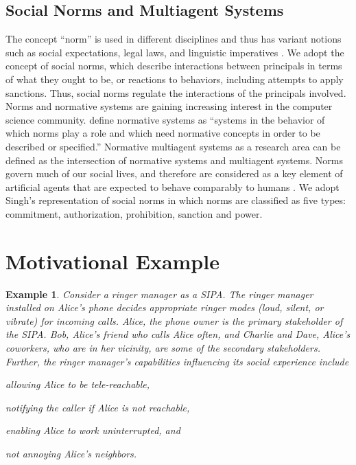 \documentclass[11pt,          %
               phd,           %
               onehalfspacing %
               ]{ncsuthesis}
\newtheorem{example}{Example}
\begin{document}
\subsection{Social Norms and Multiagent Systems}

The concept ``norm'' is used in different disciplines and thus has
variant notions such as social expectations, legal laws, and linguistic
imperatives \citep{Boella2009NormativeSystems}. We adopt the concept of
social norms, which describe interactions between principals in terms of
what they ought to be, or reactions to behaviors, including attempts to
apply sanctions. Thus, social norms regulate the interactions of the
principals involved. Norms and normative systems are gaining increasing
interest in the computer science community. \citet{Meyer+Wieringa-93}
define normative systems as ``systems in the behavior of which norms
play a role and which need normative concepts in order to be described
or specified.'' Normative multiagent systems as a research area can be
defined as the intersection of normative systems and multiagent systems.
Norms govern much of our social lives, and therefore are considered as a
key element of artificial agents that are expected to behave comparably
to humans \citep{Boella2006NormativeSystems}. We adopt Singh's
\citep{Singh-2013-Norms} representation of social norms in which norms
are classified as five types: commitment, authorization, prohibition,
sanction and power.


\section{Motivational Example}
\begin{example}
\label{ex:intro-ringer-meeting} 
Consider a ringer manager as a SIPA. The ringer manager installed on 
Alice's phone decides appropriate ringer modes (loud, silent, or 
vibrate) for incoming calls. Alice, the phone owner is the 
primary stakeholder of the SIPA. Bob, Alice's friend who 
calls Alice often, and Charlie and Dave, Alice's coworkers, who are in 
her vicinity, are some of the secondary stakeholders. Further, the ringer 
manager's capabilities influencing its social experience include
\begin{enumerate*}[label=(\arabic*)]
\item allowing Alice to be tele-reachable, 
\item notifying the caller if Alice is not reachable,
\item enabling Alice to work uninterrupted, and
\item not annoying Alice's neighbors.
\end{enumerate*}
\end{example}
\end{document}
